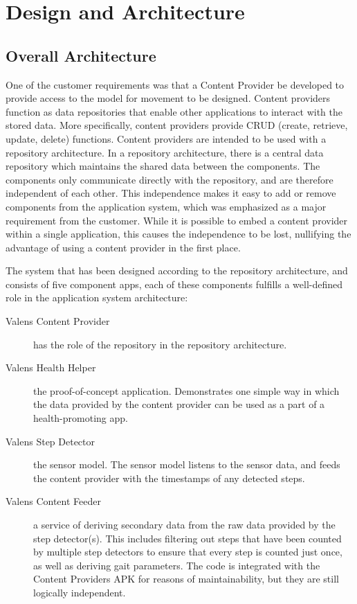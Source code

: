 \chapter{Design and Architecture}


\section{Overall Architecture}
One of the customer requirements was that a Content Provider be developed to provide access to the model for movement to be designed. Content providers function as data repositories that enable other applications to interact with the stored data. More specifically, content providers provide CRUD (create, retrieve, update, delete) functions. Content providers are intended to be used with a repository architecture. In a repository architecture, there is a central data repository which maintains the shared data between the components. The components only communicate directly with the repository, and are therefore independent of each other. This independence makes it easy to add or remove components from the application system, which was emphasized as a major requirement from the customer. While it is possible to embed a content provider within a single application, this causes the independence to be lost, nullifying the advantage of using a content provider in the first place.

The system that has been designed according to the repository architecture, and consists of five component apps, each of these components fulfills a well-defined role in the application system architecture:
\begin{description}
\item[Valens Content Provider] has the role of the repository in the repository architecture.
\item[Valens Health Helper] the proof-of-concept application. Demonstrates one simple way in which the data provided by the content provider can be used as a part of a health-promoting app.
\item[Valens Step Detector] the sensor model. The sensor model listens to the sensor data, and feeds the content provider with the timestamps of any detected steps.
\item[Valens Content Feeder] a service of deriving secondary data from the raw data provided by the step detector(s). This includes filtering out steps that have been counted by multiple step detectors to ensure that every step is counted just once, as well as deriving gait parameters. The code is integrated with the Content Providers APK for reasons of maintainability, but they are still logically independent.
\end{description}

